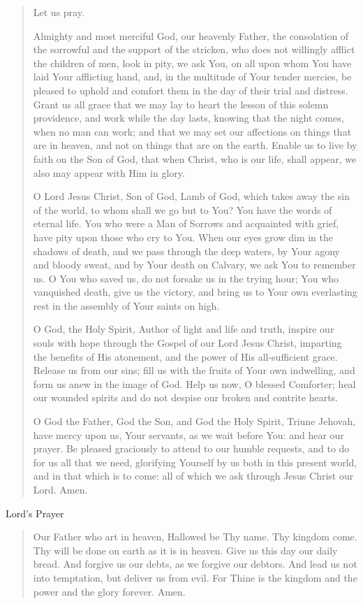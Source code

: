 \documentclass[
]{book}
\begin{document}
\begin{quote}
Let us pray.

Almighty and most merciful God, our heavenly Father, the consolation of the sorrowful and the support of the stricken, who does not willingly afflict the children of men, look in pity, we ask You, on all upon whom You have laid Your afflicting hand, and, in the multitude of Your tender mercies, be pleased to uphold and comfort them in the day of their trial and distress. Grant us all grace that we may lay to heart the lesson of this solemn providence, and work while the day lasts, knowing that the night comes, when no man can work; and that we may set our affections on things that are in heaven, and not on things that are on the earth. Enable us to live by faith on the Son of God, that when Christ, who is our life, shall appear, we also may appear with Him in glory.

O Lord Jesus Christ, Son of God, Lamb of God, which takes away the sin of the world, to whom shall we go but to You? You have the words of eternal life. You who were a Man of Sorrows and acquainted with grief, have pity upon those who cry to You. When our eyes grow dim in the shadows of death, and we pass through the deep waters, by Your agony and bloody sweat, and by Your death on Calvary, we ask You to remember us. O You who saved us, do not forsake us in the trying hour; You who vanquished death, give us the victory, and bring us to Your own everlasting rest in the assembly of Your saints on high.

O God, the Holy Spirit, Author of light and life and truth, inspire our souls with hope through the Gospel of our Lord Jesus Christ, imparting the benefits of His atonement, and the power of His all-sufficient grace. Release us from our sins; fill us with the fruits of Your own indwelling, and form us anew in the image of God. Help us now, O blessed Comforter; heal our wounded spirits and do not despise our broken and contrite hearts.

O God the Father, God the Son, and God the Holy Spirit, Triune Jehovah, have mercy upon us, Your servants, as we wait before You: and hear our prayer. Be pleased graciously to attend to our humble requests, and to do for us all that we need, glorifying Yourself by us both in this present world, and in that which is to come: all of which we ask through Jesus Christ our Lord. Amen.
\end{quote}

Lord's Prayer

\begin{quote}
Our Father who art in heaven, Hallowed be Thy name. Thy kingdom come. Thy will be done on earth as it is in heaven. Give us this day our daily bread. And forgive us our debts, as we forgive our debtors. And lead us not into temptation, but deliver us from evil. For Thine is the kingdom and the power and the glory forever. Amen.
\end{quote}
\end{document}
